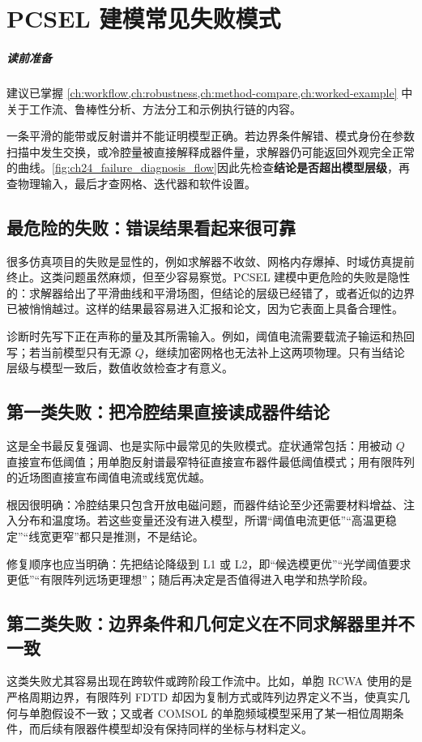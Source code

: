 \chapter{PCSEL 建模常见失败模式}
\label{ch:failure-modes}

\paragraph{读前准备}
建议已掌握 \cref{ch:workflow,ch:robustness,ch:method-compare,ch:worked-example} 中关于工作流、鲁棒性分析、方法分工和示例执行链的内容。


一条平滑的能带或反射谱并不能证明模型正确。若边界条件解错、模式身份在参数扫描中发生交换，或冷腔量被直接解释成器件量，求解器仍可能返回外观完全正常的曲线。\cref{fig:ch24_failure_diagnosis_flow}因此先检查\textbf{结论是否超出模型层级}，再查物理输入，最后才查网格、迭代器和软件设置。

\section{最危险的失败：错误结果看起来很可靠}
很多仿真项目的失败是显性的，例如求解器不收敛、网格内存爆掉、时域仿真提前终止。这类问题虽然麻烦，但至少容易察觉。PCSEL 建模中更危险的失败是隐性的：求解器给出了平滑曲线和平滑场图，但结论的层级已经错了，或者近似的边界已被悄悄越过。这样的结果最容易进入汇报和论文，因为它表面上具备合理性。

诊断时先写下正在声称的量及其所需输入。例如，阈值电流需要载流子输运和热回写；若当前模型只有无源 $Q$，继续加密网格也无法补上这两项物理。只有当结论层级与模型一致后，数值收敛检查才有意义。

\section{第一类失败：把冷腔结果直接读成器件结论}
这是全书最反复强调、也是实际中最常见的失败模式。症状通常包括：用被动 $Q$ 直接宣布低阈值；用单胞反射谱最窄特征直接宣布器件最低阈值模式；用有限阵列的近场图直接宣布阈值电流或线宽优越。

根因很明确：冷腔结果只包含开放电磁问题，而器件结论至少还需要材料增益、注入分布和温度场。若这些变量还没有进入模型，所谓“阈值电流更低”“高温更稳定”“线宽更窄”都只是推测，不是结论。

修复顺序也应当明确：先把结论降级到 L1 或 L2，即“候选模更优”“光学阈值要求更低”“有限阵列远场更理想”；随后再决定是否值得进入电学和热学阶段。

\section{第二类失败：边界条件和几何定义在不同求解器里并不一致}
这类失败尤其容易出现在跨软件或跨阶段工作流中。比如，单胞 RCWA 使用的是严格周期边界，有限阵列 FDTD 却因为复制方式或阵列边界定义不当，使真实几何与单胞假设不一致；又或者 COMSOL 的单胞频域模型采用了某一相位周期条件，而后续有限器件模型却没有保持同样的坐标与材料定义。

